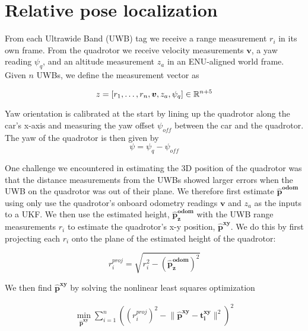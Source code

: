 
\section{Relative pose localization}

From each Ultrawide Band (UWB) tag we receive a range measurement $r_i$ in its own frame. 
From the quadrotor we receive velocity measurements $\bm{v}$, a yaw reading $\psi_q$,
and an altitude measurement $z_a$ in an ENU-aligned world frame.
Given $n$ UWBs, we define the measurement vector as

$$
   z = [r_1, \dots, r_n, \bm{v}, z_a, \psi_q] \in \mathbb{R}^{n+5}
$$



Yaw orientation is calibrated at the start by lining up the quadrotor along the car's x-axis
and measuring the yaw offset $\psi_{off}$ between the car and the quadrotor.
The yaw of the quadrotor is then given by
$$
   \psi = \psi_q - \psi_{off}
$$

One challenge we encountered in estimating the 3D position of the quadrotor was that
the distance measurements from the UWBs showed larger errors when the UWB on the quadrotor was out of their plane.
We therefore first estimate $\bm{\hat{p}^{odom}}$ using only use the quadrotor's onboard 
odometry readings $\bm{v}$ and $z_a$ as the inputs to a UKF. We then use the estimated
height, $\bm{\hat{p}_z^{odom}}$ with the UWB range
measurements $r_i$ to estimate the quadrotor's x-y position, $\bm{\hat{p}^{xy}}$.
We do this by first projecting each $r_i$ onto the plane of the estimated height of the quadrotor:

$$
   r_i^{proj} = \sqrt{r_i^2 - (\bm{\hat{p}_z^{odom}})^2}
$$

We then find $\bm{\hat{p}^{xy}}$ by solving the nonlinear least squares optimization

\begin{align*} 
    \min_{{\bm{\hat{p}^{xy}}}} \sum_{i=1}^{n} ((r_{i}^{proj})^2 - \lVert \bm{\hat{p}^{xy}} - \bm{t_i^{xy}}\rVert^2)^2
\end{align*}

